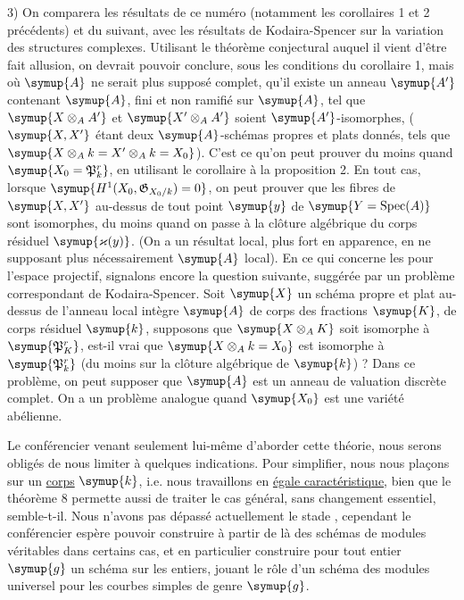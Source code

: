 3) On comparera les résultats de ce numéro (notamment les corollaires 1 et 2
précédents) et du suivant, avec les résultats de Kodaira-Spencer sur la
variation des structures complexes. Utilisant le théorème conjectural auquel
il vient d'être fait allusion, on devrait pouvoir conclure, sous les conditions
du corollaire 1, mais où $\symup{A}$ ne serait plus supposé complet, qu'il existe un
anneau $\symup{A'}$ contenant $\symup{A}$, fini et non ramifié sur $\symup{A}$, tel que
$\symup{X\otimes_A A'}$ et $\symup{X'\otimes_A A'}$ soient $\symup{A'}$-isomorphes, ($\symup{X,X'}$ étant deux
$\symup{A}$-schémas propres et plats donnés, tels que
$\symup{X\otimes_A k=X'\otimes_A k=X_0}$). C'est ce qu'on peut prouver du moins quand
$\symup{X_0=\mathfrak P_k^r}$, en utilisant le corollaire à la proposition 2. En tout
cas, lorsque $\symup{H^1(X_0,\mathfrak G_{X_0/k})=0}$, on peut prouver que les fibres de
$\symup{X,X'}$ au-dessus de tout point $\symup{y}$ de $\symup{Y=\operatorname{Spec}(A)}$ sont
isomorphes, du moins quand on passe à la clôture algébrique du corps résiduel
$\symup{\varkappa(y)}$. (On a un résultat local, plus fort en apparence, en ne supposant
plus nécessairement $\symup{A}$ local). En ce qui concerne les  pour l'espace projectif, signalons encore la question suivante,
suggérée par un problème correspondant de Kodaira-Spencer. Soit $\symup{X}$ un schéma
propre et plat au-dessus de l'anneau local intègre $\symup{A}$ de corps des fractions
$\symup{K}$, de corps résiduel $\symup{k}$, supposons que $\symup{X\otimes_A K}$ soit isomorphe à
$\symup{\mathfrak P_K^r}$, est-il vrai que $\symup{X\otimes_A k=X_0}$ est isomorphe à
$\symup{\mathfrak P_k^r}$ (du moins sur la clôture algébrique de $\symup{k}$) ? Dans ce problème,
on peut supposer que $\symup{A}$ est un anneau de valuation discrète complet. On a un
problème analogue quand $\symup{X_0}$ est une variété abélienne.


Le conférencier venant seulement lui-même d'aborder cette théorie, nous serons
obligés de nous limiter à quelques indications. Pour simplifier, nous nous
plaçons sur un \uline{corps} $\symup{k}$, i.e. nous travaillons en \uline{égale caractéristique}, bien
que le théorème 8 permette aussi de traiter le cas général, sans changement
essentiel, semble-t-il. Nous n'avons pas dépassé actuellement le stade
, cependant le conférencier espère pouvoir construire à partir de là
des schémas de modules
véritables dans certains cas, et en particulier
construire pour tout entier $\symup{g}$ un schéma sur les entiers, jouant le rôle d'un
schéma des modules universel pour les courbes simples de genre $\symup{g}$.

